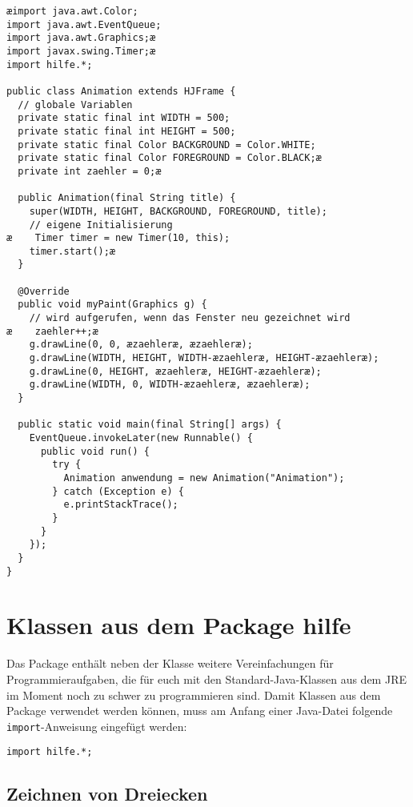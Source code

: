 \begin{lstlisting}
æimport java.awt.Color;
import java.awt.EventQueue;
import java.awt.Graphics;æ
import javax.swing.Timer;æ
import hilfe.*;

public class Animation extends HJFrame {
  // globale Variablen
  private static final int WIDTH = 500;
  private static final int HEIGHT = 500;
  private static final Color BACKGROUND = Color.WHITE;
  private static final Color FOREGROUND = Color.BLACK;æ
  private int zaehler = 0;æ

  public Animation(final String title) {
    super(WIDTH, HEIGHT, BACKGROUND, FOREGROUND, title);
    // eigene Initialisierung
æ    Timer timer = new Timer(10, this);
    timer.start();æ
  }
  
  @Override
  public void myPaint(Graphics g) {
    // wird aufgerufen, wenn das Fenster neu gezeichnet wird
æ    zaehler++;æ
    g.drawLine(0, 0, æzaehleræ, æzaehleræ);
    g.drawLine(WIDTH, HEIGHT, WIDTH-æzaehleræ, HEIGHT-æzaehleræ);
    g.drawLine(0, HEIGHT, æzaehleræ, HEIGHT-æzaehleræ);
    g.drawLine(WIDTH, 0, WIDTH-æzaehleræ, æzaehleræ);
  }
  
  public static void main(final String[] args) {
    EventQueue.invokeLater(new Runnable() {
      public void run() {
        try {
          Animation anwendung = new Animation("Animation");
        } catch (Exception e) {
          e.printStackTrace();
        }
      }
    });
  }
}
\end{lstlisting}


\section{Klassen aus dem Package hilfe}

Das Package  enthält neben der Klasse  weitere
Vereinfachungen für Programmieraufgaben, die für euch mit den
Standard-Java-Klassen aus dem JRE im Moment noch zu schwer zu programmieren
sind. Damit Klassen aus dem Package  verwendet werden können,
muss am Anfang einer Java-Datei folgende \lstinline|import|-Anweisung eingefügt
werden:

\begin{lstlisting}
import hilfe.*;
\end{lstlisting}

\subsection{Zeichnen von Dreiecken}

